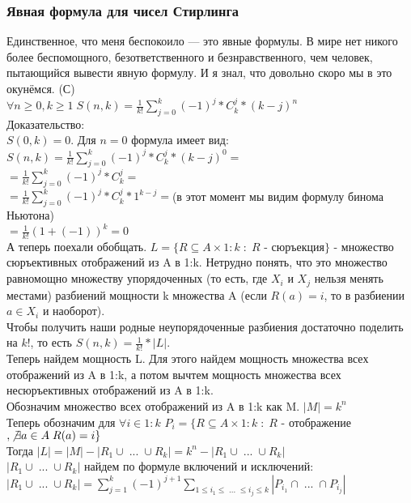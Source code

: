 \subsubsection{Явная формула для чисел Стирлинга}
Единственное, что меня беспокоило — это явные формулы. В мире нет никого более беспомощного, безответственного и безнравственного, чем человек, пытающийся вывести явную формулу. И я знал, что довольно скоро мы в это окунёмся. (С)\\
$\forall n \geq 0, k \geq 1 \; S(n, k) = \frac{1}{k!}\sum\limits_{j = 0}^{k}(-1)^j * C_k^j * (k - j)^n$\\
Доказательство:\\
$S(0, k) = 0$. Для $n = 0$ формула имеет вид:\\
$S(n, k) = \frac{1}{k!}\sum\limits_{j = 0}^{k}(-1)^j * C_k^j * (k - j)^0 =$\\
$ = \frac{1}{k!}\sum\limits_{j = 0}^{k}(-1)^j * C_k^j = $\\
$ = \frac{1}{k!}\sum\limits_{j = 0}^{k}(-1)^j * C_k^j * 1^{k - j} = $(в этот момент мы видим формулу бинома Ньютона)\\
$ = \frac{1}{k!}(1 + (-1))^k = 0$\\
А теперь поехали обобщать. $L = \{R \subseteq A \times 1:k \; : \; R$ - сюръекция$\}$ - множество сюръективных отображений из A в 1:k. Нетрудно понять, что это множество равномощно множеству упорядоченных (то есть, где $X_i$ и $X_j$ нельзя менять местами) разбиений мощности k множества A (если $R(a) = i$, то в разбиении $a \in X_i$ и наоборот).\\
Чтобы получить наши родные неупорядоченные разбиения достаточно поделить на $k!$, то есть $S(n, k) = \frac{1}{k!} * |L|$. \\
Теперь найдем мощность L. Для этого найдем мощность множества всех отображений из A в 1:k, а потом вычтем мощность множества всех несюръективных отображений из A в 1:k.\\
Обозначим множество всех отображений из A в 1:k как M. $|M| = k^n$\\
Теперь обозначим для $\forall i \in 1:k$ $P_i = \{R \subseteq A \times 1:k \; : \; R$ - отображение$, \not\exists a \in A \; R(a) = i\}$\\
Тогда $|L| = |M| - |R_1 \cup \; ... \; \cup R_k| = k^n - |R_1 \cup \; ... \; \cup R_k|$\\
$|R_1 \cup \; ... \; \cup R_k|$ найдем по формуле включений и исключений:\\
$|R_1 \cup \; ... \; \cup R_k| = \sum_{j = 1}^{k}(-1)^{j + 1}\sum\limits_{1 \leq i_1 \leq \; ... \; \leq i_j \leq k}|P_{i_1} \cap \; ... \; \cap P_{i_j}|$\\
